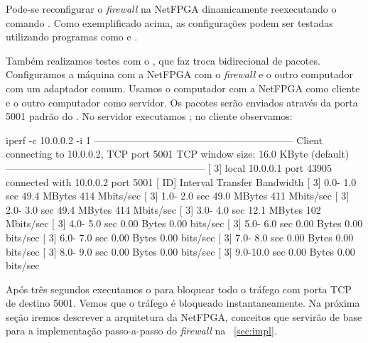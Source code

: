 Pode-se reconfigurar o \emph{firewall} na NetFPGA dinamicamente
reexecutando o comando .  Como exemplificado acima, as
configurações podem ser testadas utilizando programas como
 e .

Também realizamos testes com o , que faz troca
bidirecional de pacotes. Configuramos a máquina com a NetFPGA com o
\emph{firewall} e o outro computador com um adaptador comum. Usamos
o computador com a NetFPGA como cliente e o outro computador como
servidor. Os pacotes serão enviados através da porta 5001 padrão do
.  No servidor executamos ; no cliente
observamos:

\begin{verbnobox}[\small]
iperf -c 10.0.0.2 -i 1
------------------------------------------------------------
Client connecting to 10.0.0.2, TCP port 5001
TCP window size: 16.0 KByte (default)
------------------------------------------------------------
[  3] local 10.0.0.1 port 43905 connected with 10.0.0.2 port 5001
[ ID] Interval       Transfer     Bandwidth
[  3]  0.0- 1.0 sec  49.4 MBytes   414 Mbits/sec
[  3]  1.0- 2.0 sec  49.0 MBytes   411 Mbits/sec
[  3]  2.0- 3.0 sec  49.4 MBytes   414 Mbits/sec
[  3]  3.0- 4.0 sec  12.1 MBytes   102 Mbits/sec
[  3]  4.0- 5.0 sec  0.00 Bytes  0.00 bits/sec
[  3]  5.0- 6.0 sec  0.00 Bytes  0.00 bits/sec
[  3]  6.0- 7.0 sec  0.00 Bytes  0.00 bits/sec
[  3]  7.0- 8.0 sec  0.00 Bytes  0.00 bits/sec
[  3]  8.0- 9.0 sec  0.00 Bytes  0.00 bits/sec
[  3]  9.0-10.0 sec  0.00 Bytes  0.00 bits/sec
\end{verbnobox}

Após três segundos executamos o  para bloquear todo o
tráfego com porta TCP de destino 5001.  Vemos que o tráfego é
bloqueado instantaneamente. Na próxima seção iremos descrever a
arquitetura da NetFPGA, conceitos que servirão de base para a
implementação passo-a-passo do \emph{firewall} na
\secstr~\ref{sec:impl}.
